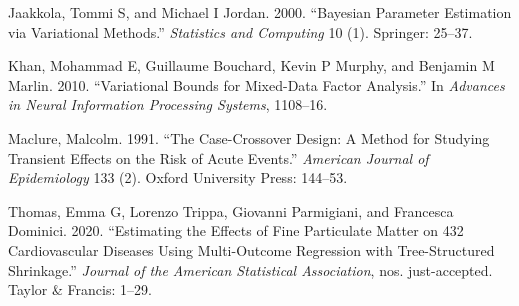 \documentclass[]{article}
\begin{document}
\leavevmode\hypertarget{ref-jaakkola2000bayesian}{}%
Jaakkola, Tommi S, and Michael I Jordan. 2000. ``Bayesian Parameter
Estimation via Variational Methods.'' \emph{Statistics and Computing} 10
(1). Springer: 25--37.

\leavevmode\hypertarget{ref-khan2010variational}{}%
Khan, Mohammad E, Guillaume Bouchard, Kevin P Murphy, and Benjamin M
Marlin. 2010. ``Variational Bounds for Mixed-Data Factor Analysis.'' In
\emph{Advances in Neural Information Processing Systems}, 1108--16.

\leavevmode\hypertarget{ref-maclure1991case}{}%
Maclure, Malcolm. 1991. ``The Case-Crossover Design: A Method for
Studying Transient Effects on the Risk of Acute Events.'' \emph{American
Journal of Epidemiology} 133 (2). Oxford University Press: 144--53.

\leavevmode\hypertarget{ref-thomas2020estimating}{}%
Thomas, Emma G, Lorenzo Trippa, Giovanni Parmigiani, and Francesca
Dominici. 2020. ``Estimating the Effects of Fine Particulate Matter on
432 Cardiovascular Diseases Using Multi-Outcome Regression with
Tree-Structured Shrinkage.'' \emph{Journal of the American Statistical
Association}, nos. just-accepted. Taylor \& Francis: 1--29.
\end{document}
